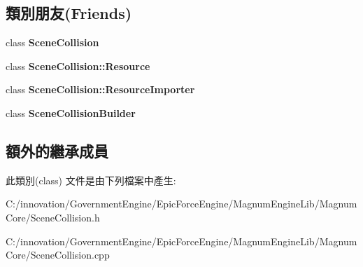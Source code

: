 \subsection*{類別朋友(Friends)}
\begin{DoxyCompactItemize}
\item 
class {\bfseries Scene\+Collision}\hypertarget{class_i_dream_sky_1_1_scene_collision_1_1_resource_a7f7f4483f99e66d8de91c12344383316}{}\label{class_i_dream_sky_1_1_scene_collision_1_1_resource_a7f7f4483f99e66d8de91c12344383316}

\item 
class {\bfseries Scene\+Collision\+::\+Resource}\hypertarget{class_i_dream_sky_1_1_scene_collision_1_1_resource_a71b236c1c24fec68b8fc80e32c6a1df9}{}\label{class_i_dream_sky_1_1_scene_collision_1_1_resource_a71b236c1c24fec68b8fc80e32c6a1df9}

\item 
class {\bfseries Scene\+Collision\+::\+Resource\+Importer}\hypertarget{class_i_dream_sky_1_1_scene_collision_1_1_resource_a7892633f22a5e0a8a9dcf89bb56cdff8}{}\label{class_i_dream_sky_1_1_scene_collision_1_1_resource_a7892633f22a5e0a8a9dcf89bb56cdff8}

\item 
class {\bfseries Scene\+Collision\+Builder}\hypertarget{class_i_dream_sky_1_1_scene_collision_1_1_resource_a2d946a399a3297cd5ab77a3604b6211e}{}\label{class_i_dream_sky_1_1_scene_collision_1_1_resource_a2d946a399a3297cd5ab77a3604b6211e}

\end{DoxyCompactItemize}
\subsection*{額外的繼承成員}


此類別(class) 文件是由下列檔案中產生\+:\begin{DoxyCompactItemize}
\item 
C\+:/innovation/\+Government\+Engine/\+Epic\+Force\+Engine/\+Magnum\+Engine\+Lib/\+Magnum\+Core/Scene\+Collision.\+h\item 
C\+:/innovation/\+Government\+Engine/\+Epic\+Force\+Engine/\+Magnum\+Engine\+Lib/\+Magnum\+Core/Scene\+Collision.\+cpp\end{DoxyCompactItemize}
